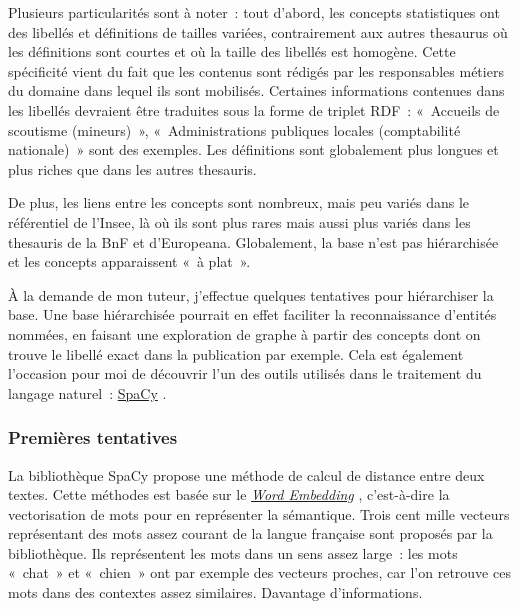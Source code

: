 Plusieurs particularités sont à noter~: tout d'abord, les concepts statistiques ont des libellés et définitions de tailles variées, contrairement aux autres thesaurus où les définitions sont courtes et où la taille des libellés est homogène. Cette spécificité vient du fait que les contenus sont rédigés par les responsables métiers du domaine dans lequel ils sont mobilisés. Certaines informations contenues dans les libellés devraient être traduites sous la forme de triplet RDF~: «~Accueils de scoutisme (mineurs)~», «~Administrations publiques locales (comptabilité nationale)~» sont des exemples. Les définitions sont globalement plus longues et plus riches que dans les autres thesauris.

De plus, les liens entre les concepts sont nombreux, mais peu variés dans le référentiel de l'Insee, là où ils sont plus rares mais aussi plus variés dans les thesauris de la BnF et d'Europeana. Globalement, la base n'est pas hiérarchisée et les concepts apparaissent «~à plat~».
\newline

À la demande de mon tuteur, j'effectue quelques tentatives pour hiérarchiser la base. Une base hiérarchisée pourrait en effet faciliter la reconnaissance d'entités nommées, en faisant une exploration de graphe à partir des concepts dont on trouve le libellé exact dans la publication par exemple. Cela est également l'occasion pour moi de découvrir l'un des outils utilisés dans le traitement du langage naturel~: \href{https://spacy.io/}{SpaCy} \cite{spacy2}.
\label{section 1.2.1}

\subsubsection*{Premières tentatives}
La bibliothèque SpaCy propose une méthode de calcul de distance entre deux textes. Cette méthodes est basée sur le \href{https://en.wikipedia.org/wiki/Word_embedding}{\textit{Word Embedding}} \cite{word-embedding} \cite{word-embedding-opencls}, c'est-à-dire la vectorisation de mots pour en représenter la sémantique. Trois cent mille vecteurs représentant des mots assez courant de la langue française sont proposés par la bibliothèque. Ils représentent les mots dans un sens assez large~: les mots «~chat~» et «~chien~» ont par exemple des vecteurs proches, car l'on retrouve ces mots dans des contextes assez similaires. Davantage d'informations.
\newline

